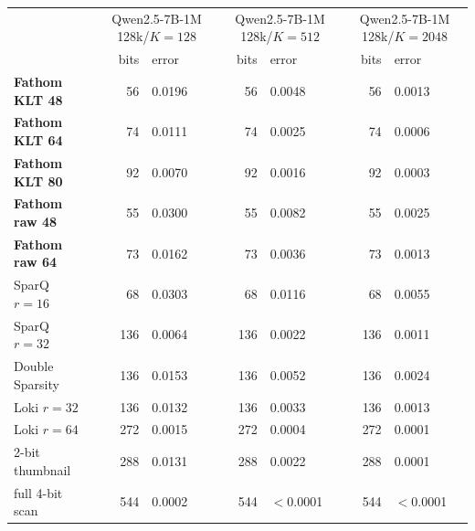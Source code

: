 \begin{tabular}{lrlrlrl}
\toprule
 & \multicolumn{2}{c}{Qwen2.5-7B-1M 128k/$K{=}128$} & \multicolumn{2}{c}{Qwen2.5-7B-1M 128k/$K{=}512$} & \multicolumn{2}{c}{Qwen2.5-7B-1M 128k/$K{=}2048$} \\
 & bits & error & bits & error & bits & error \\
\midrule
\textbf{Fathom KLT 48} & 56 & 0.0196 & 56 & 0.0048 & 56 & 0.0013 \\
\textbf{Fathom KLT 64} & 74 & 0.0111 & 74 & 0.0025 & 74 & 0.0006 \\
\textbf{Fathom KLT 80} & 92 & 0.0070 & 92 & 0.0016 & 92 & 0.0003 \\
\textbf{Fathom raw 48} & 55 & 0.0300 & 55 & 0.0082 & 55 & 0.0025 \\
\textbf{Fathom raw 64} & 73 & 0.0162 & 73 & 0.0036 & 73 & 0.0013 \\
SparQ $r{=}16$ & 68 & 0.0303 & 68 & 0.0116 & 68 & 0.0055 \\
SparQ $r{=}32$ & 136 & 0.0064 & 136 & 0.0022 & 136 & 0.0011 \\
Double Sparsity & 136 & 0.0153 & 136 & 0.0052 & 136 & 0.0024 \\
Loki $r{=}32$ & 136 & 0.0132 & 136 & 0.0033 & 136 & 0.0013 \\
Loki $r{=}64$ & 272 & 0.0015 & 272 & 0.0004 & 272 & 0.0001 \\
2-bit thumbnail & 288 & 0.0131 & 288 & 0.0022 & 288 & 0.0001 \\
full 4-bit scan & 544 & 0.0002 & 544 & $<$0.0001 & 544 & $<$0.0001 \\
\bottomrule
\end{tabular}